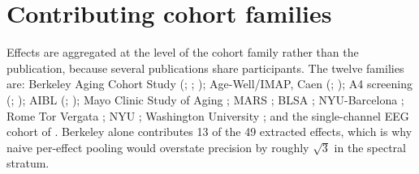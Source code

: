 \section{Contributing cohort families}
\label{app:cohorts}

Effects are aggregated at the level of the cohort family rather than the publication, because
several publications share participants. The twelve families are: Berkeley Aging Cohort Study
(\citealp{mander2015}; \citealp{winer2019}; \citealp{winer2020}); Age-Well/IMAP, Caen
(\citealp{champetier2024}; \citealp{montagne2026}); A4 screening
(\citealp{winer2021}; \citealp{insel2021}); AIBL (\citealp{brown2016}; \citealp{pivac2024});
Mayo Clinic Study of Aging \citep{carvalho2024}; MARS \citep{jin2025}; BLSA
\citep{spira2013}; NYU-Barcelona \citep{stankeviciute2024}; Rome Tor Vergata
\citep{liguori2020}; NYU \citep{varga2016}; Washington University \citep{ju2017}; and the
single-channel EEG cohort of \citet{lucey2019}. Berkeley alone contributes 13 of the 49
extracted effects, which is why naive per-effect pooling would overstate precision by roughly
$\sqrt{3}$ in the spectral stratum.
